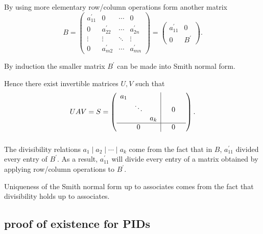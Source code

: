 \documentclass{beamer}
\begin{document}
\begin{frame}
  \frametitle{}

  By using more elementary row/column operations form another matrix \[B = \left(\begin{array}{c|ccc}
    a_{11}^{\prime} & 0 &\cdots &0\\
    \hline
    0 & a_{22}^{\prime} & \cdots & a_{2n}^{\prime}\\
    \vdots & \vdots &\ddots &\vdots\\
    0 & a_{m2}^{\prime} & \cdots & a_{mn}^{\prime}
  \end{array}\right) = \left(\begin{array}{c|ccc}
    a_{11}^{\prime} & 0\\
    \hline
    0 & B^{\prime} 
  \end{array}\right).\]

  By induction the smaller matrix $B^{\prime}$ can be made into Smith normal form.

  Hence there exist invertible matrices $U,V$ such that \[UAV = S =\left(\begin{array}{ccc|ccc}
    a_1 &  &  &  &  &\\
     & \ddots &  &  &0 &\\
     &  & a_k &  & \\
     \hline
     & 0 &  &  &0
  \end{array}\right). \]

\end{frame}

\begin{frame}
  \frametitle{}

  The divisibility relations $a_1\mid a_2\mid \cdots \mid a_k$ come from the fact that in $B$, $a_{11}^{\prime}$ divided every entry of $B^{\prime}$. As a result, $a_{11}^{\prime}$ will divide every entry of a matrix obtained by applying row/column operations to $B^{\prime}$. 

  Uniqueness of the Smith normal form up to associates comes from the fact that divisibility holds up to associates.

\end{frame}

\subsection{proof of existence for PIDs}
\end{document}
